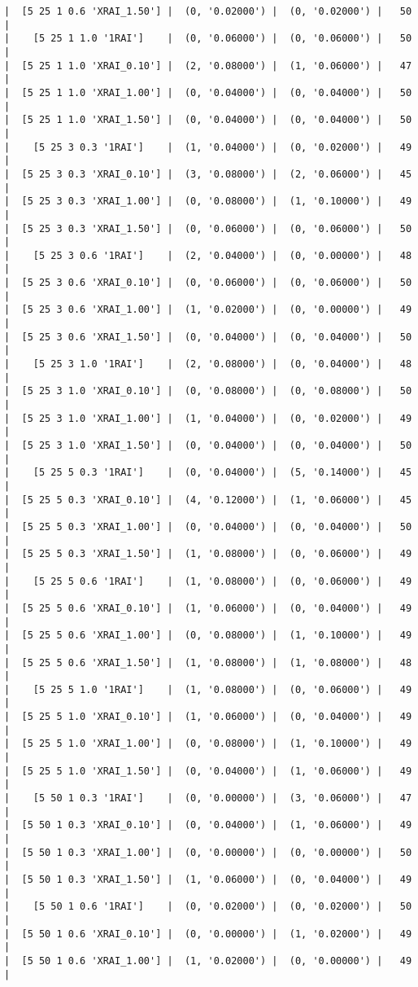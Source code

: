 \documentclass{article}
\begin{document}
\begin{verbatim}
|  [5 25 1 0.6 'XRAI_1.50'] |  (0, '0.02000') |  (0, '0.02000') |   50  |
|    [5 25 1 1.0 '1RAI']    |  (0, '0.06000') |  (0, '0.06000') |   50  |
|  [5 25 1 1.0 'XRAI_0.10'] |  (2, '0.08000') |  (1, '0.06000') |   47  |
|  [5 25 1 1.0 'XRAI_1.00'] |  (0, '0.04000') |  (0, '0.04000') |   50  |
|  [5 25 1 1.0 'XRAI_1.50'] |  (0, '0.04000') |  (0, '0.04000') |   50  |
|    [5 25 3 0.3 '1RAI']    |  (1, '0.04000') |  (0, '0.02000') |   49  |
|  [5 25 3 0.3 'XRAI_0.10'] |  (3, '0.08000') |  (2, '0.06000') |   45  |
|  [5 25 3 0.3 'XRAI_1.00'] |  (0, '0.08000') |  (1, '0.10000') |   49  |
|  [5 25 3 0.3 'XRAI_1.50'] |  (0, '0.06000') |  (0, '0.06000') |   50  |
|    [5 25 3 0.6 '1RAI']    |  (2, '0.04000') |  (0, '0.00000') |   48  |
|  [5 25 3 0.6 'XRAI_0.10'] |  (0, '0.06000') |  (0, '0.06000') |   50  |
|  [5 25 3 0.6 'XRAI_1.00'] |  (1, '0.02000') |  (0, '0.00000') |   49  |
|  [5 25 3 0.6 'XRAI_1.50'] |  (0, '0.04000') |  (0, '0.04000') |   50  |
|    [5 25 3 1.0 '1RAI']    |  (2, '0.08000') |  (0, '0.04000') |   48  |
|  [5 25 3 1.0 'XRAI_0.10'] |  (0, '0.08000') |  (0, '0.08000') |   50  |
|  [5 25 3 1.0 'XRAI_1.00'] |  (1, '0.04000') |  (0, '0.02000') |   49  |
|  [5 25 3 1.0 'XRAI_1.50'] |  (0, '0.04000') |  (0, '0.04000') |   50  |
|    [5 25 5 0.3 '1RAI']    |  (0, '0.04000') |  (5, '0.14000') |   45  |
|  [5 25 5 0.3 'XRAI_0.10'] |  (4, '0.12000') |  (1, '0.06000') |   45  |
|  [5 25 5 0.3 'XRAI_1.00'] |  (0, '0.04000') |  (0, '0.04000') |   50  |
|  [5 25 5 0.3 'XRAI_1.50'] |  (1, '0.08000') |  (0, '0.06000') |   49  |
|    [5 25 5 0.6 '1RAI']    |  (1, '0.08000') |  (0, '0.06000') |   49  |
|  [5 25 5 0.6 'XRAI_0.10'] |  (1, '0.06000') |  (0, '0.04000') |   49  |
|  [5 25 5 0.6 'XRAI_1.00'] |  (0, '0.08000') |  (1, '0.10000') |   49  |
|  [5 25 5 0.6 'XRAI_1.50'] |  (1, '0.08000') |  (1, '0.08000') |   48  |
|    [5 25 5 1.0 '1RAI']    |  (1, '0.08000') |  (0, '0.06000') |   49  |
|  [5 25 5 1.0 'XRAI_0.10'] |  (1, '0.06000') |  (0, '0.04000') |   49  |
|  [5 25 5 1.0 'XRAI_1.00'] |  (0, '0.08000') |  (1, '0.10000') |   49  |
|  [5 25 5 1.0 'XRAI_1.50'] |  (0, '0.04000') |  (1, '0.06000') |   49  |
|    [5 50 1 0.3 '1RAI']    |  (0, '0.00000') |  (3, '0.06000') |   47  |
|  [5 50 1 0.3 'XRAI_0.10'] |  (0, '0.04000') |  (1, '0.06000') |   49  |
|  [5 50 1 0.3 'XRAI_1.00'] |  (0, '0.00000') |  (0, '0.00000') |   50  |
|  [5 50 1 0.3 'XRAI_1.50'] |  (1, '0.06000') |  (0, '0.04000') |   49  |
|    [5 50 1 0.6 '1RAI']    |  (0, '0.02000') |  (0, '0.02000') |   50  |
|  [5 50 1 0.6 'XRAI_0.10'] |  (0, '0.00000') |  (1, '0.02000') |   49  |
|  [5 50 1 0.6 'XRAI_1.00'] |  (1, '0.02000') |  (0, '0.00000') |   49  |

\end{verbatim}
\end{document}
